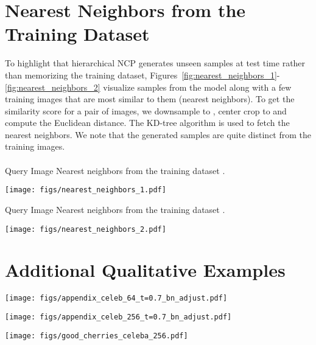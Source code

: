 \documentclass{article} \usepackage{iclr2021_conference,times}
\begin{document}
\section{Nearest Neighbors from the Training Dataset} \label{app:nn}
To highlight that hierarchical NCP generates unseen samples at test time rather than memorizing the training dataset, Figures~\ref{fig:nearest_neighbors_1}-\ref{fig:nearest_neighbors_2} visualize samples from the model along with a few training images that are most similar to them (nearest neighbors). To get the similarity score for a pair of images, we downsample  to , center crop to  and compute the Euclidean distance. The KD-tree algorithm is used to fetch the nearest neighbors. We note that the generated samples are quite distinct from the training images.\\\\
\newpage
{\color{blue}Query Image} \hfill {\color{blue}Nearest neighbors from the training dataset} \hfill .
\begin{figure*}[h]
    \centering
    \texttt{[image: figs/nearest\_neighbors\_1.pdf]}
    \caption{Query images (left) and their nearest neighbors from the CelebA-HQ-256 training dataset.}
    \label{fig:nearest_neighbors_1}
\end{figure*}

\newpage
{\color{blue}Query Image} \hfill {\color{blue}Nearest neighbors from the training dataset} \hfill .
\begin{figure*}[ht]
    \centering
    \texttt{[image: figs/nearest\_neighbors\_2.pdf]}
    \caption{Query images (left) and their nearest neighbors from the CelebA-HQ-256 training dataset.}
    \label{fig:nearest_neighbors_2}
\end{figure*}

\newpage
\section{Additional Qualitative Examples} \label{app:qual celeb 64}
\begin{figure*}[h!]
    \centering
    \texttt{[image: figs/appendix\_celeb\_64\_t=0.7\_bn\_adjust.pdf]}
    \caption{ Additional samples from CelebA-64 at . }
    \label{fig: additional samples celeb 64}
\end{figure*}

\begin{figure*}[ht]
    \centering
    \texttt{[image: figs/appendix\_celeb\_256\_t=0.7\_bn\_adjust.pdf]}
    \caption{ Additional samples from CelebA-HQ-256 at . }
    \label{fig: additional samples celeb 256}
\end{figure*}

\begin{figure*}[ht]
    \centering
    \texttt{[image: figs/good\_cherries\_celeba\_256.pdf]}
    \caption{Selected good quality samples from CelebA-HQ-256. }
    \label{fig:cherries}
\end{figure*} 
\end{document}
